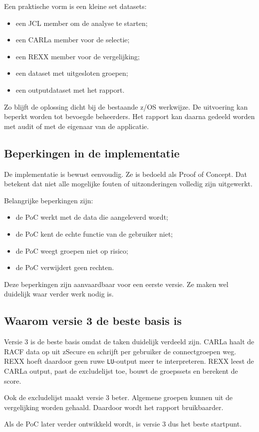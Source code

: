 Een praktische vorm is een kleine set datasets:

\begin{itemize}
	\item een JCL member om de analyse te starten;
	\item een CARLa member voor de selectie;
	\item een REXX member voor de vergelijking;
	\item een dataset met uitgesloten groepen;
	\item een outputdataset met het rapport.
\end{itemize}

Zo blijft de oplossing dicht bij de bestaande z/OS werkwijze. De uitvoering kan beperkt worden tot bevoegde beheerders. Het rapport kan daarna gedeeld worden met audit of met de eigenaar van de applicatie.

\subsection*{Beperkingen in de implementatie}

De implementatie is bewust eenvoudig. Ze is bedoeld als Proof of Concept. Dat betekent dat niet alle mogelijke fouten of uitzonderingen volledig zijn uitgewerkt.

Belangrijke beperkingen zijn:

\begin{itemize}
	\item de PoC werkt met de data die aangeleverd wordt;
	\item de PoC kent de echte functie van de gebruiker niet;
	\item de PoC weegt groepen niet op risico;
	\item de PoC verwijdert geen rechten.
\end{itemize}

Deze beperkingen zijn aanvaardbaar voor een eerste versie. Ze maken wel duidelijk waar verder werk nodig is.

\subsection*{Waarom versie 3 de beste basis is}

Versie 3 is de beste basis omdat de taken duidelijk verdeeld zijn. CARLa haalt de RACF data op uit zSecure en schrijft per gebruiker de connectgroepen weg. REXX hoeft daardoor geen ruwe \texttt{LU}-output meer te interpreteren. REXX leest de CARLa output, past de excludelijst toe, bouwt de groepssets en berekent de score.

Ook de excludelijst maakt versie 3 beter. Algemene groepen kunnen uit de vergelijking worden gehaald. Daardoor wordt het rapport bruikbaarder.

Als de PoC later verder ontwikkeld wordt, is versie 3 dus het beste startpunt.
